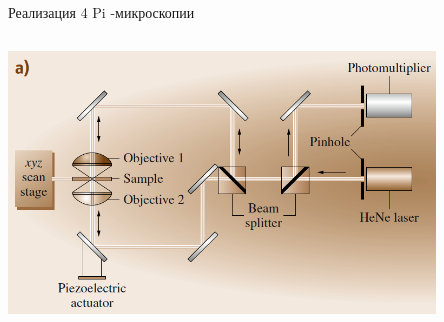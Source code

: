 \documentclass[9pt, compress, xcolor=table]{beamer}
\begin{document}
\begin{frame}{Реализация 4 Pi -микроскопии}
\begin{columns}[c]
\begin{center}
\includegraphics[width=0.85\textwidth]{ffm02b}
\end{center}
\end{columns}
\end{frame}
\end{document}

